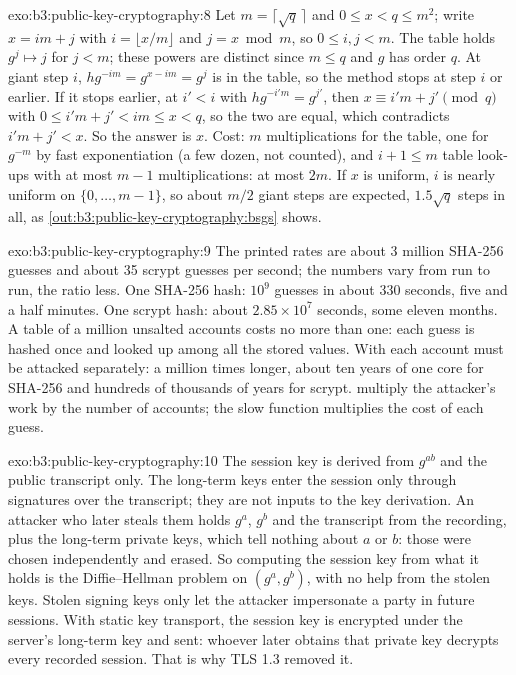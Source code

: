 \begin{solution}{exo:b3:public-key-cryptography:8}
Let $m = \lceil \sqrt{q}\, \rceil$ and $0 \le x < q \le m^2$; write $x = im + j$ with $i = \lfloor x/m \rfloor$ and $j = x \bmod m$, so $0 \le i, j < m$. The table holds $g^j \mapsto j$ for $j < m$; these powers are distinct since $m \le q$ and $g$ has order $q$. At giant step $i$, $h g^{-im} = g^{x - im} = g^j$ is in the table, so the method stops at step $i$ or earlier. If it stops earlier, at $i' < i$ with $h g^{-i'm} = g^{j'}$, then $x \equiv i'm + j' \pmod q$ with $0 \le i'm + j' < im \le x < q$, so the two are equal, which contradicts $i'm + j' < x$. So the answer is $x$. Cost: $m$ multiplications for the table, one for $g^{-m}$ by fast exponentiation (a few dozen, not counted), and $i + 1 \le m$ table look-ups with at most $m - 1$ multiplications: at most $2m$. If $x$ is uniform, $i$ is nearly uniform on $\{0, \ldots, m - 1\}$, so about $m/2$ giant steps are expected, $1.5\sqrt{q}$ steps in all, as \cref{out:b3:public-key-cryptography:bsgs} shows.
\end{solution}

\begin{solution}{exo:b3:public-key-cryptography:9}
The printed rates are about 3 million SHA-256 guesses and about 35 scrypt guesses per second; the numbers vary from run to run, the ratio less. One SHA-256 hash: $10^9$ guesses in about 330 seconds, five and a half minutes. One scrypt hash: about $2.85 \times 10^7$ seconds, some eleven months. A table of a million unsalted accounts costs no more than one: each guess is hashed once and looked up among all the stored values. With  each account must be attacked separately: a million times longer, about ten years of one core for SHA-256 and hundreds of thousands of years for scrypt.  multiply the attacker's work by the number of accounts; the slow function multiplies the cost of each guess.
\end{solution}

\begin{solution}{exo:b3:public-key-cryptography:10}
The session key is derived from $g^{ab}$ and the public transcript only. The long-term keys enter the session only through signatures over the transcript; they are not inputs to the key derivation. An attacker who later steals them holds $g^a$, $g^b$ and the transcript from the recording, plus the long-term private keys, which tell nothing about $a$ or $b$: those were chosen independently and erased. So computing the session key from what it holds is the Diffie--Hellman problem on $(g^a, g^b)$, with no help from the stolen keys. Stolen signing keys only let the attacker impersonate a party in future sessions. With static  key transport, the session key is encrypted under the server's long-term key and sent: whoever later obtains that private key decrypts every recorded session. That is why TLS 1.3 removed it.
\end{solution}

